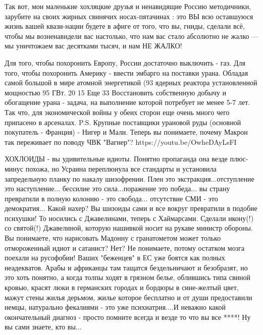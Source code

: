 Так вот, мои маленькие хохляцкие друзья и ненавидящие Россию методичники,
зарубите на своих жирных свинячих носах-пятачинах : это ВЫ всю оставшуюся жизнь
вашей квази-нации будете в афиге от того, что вы, гниды, сделали всё, чтобы мы
возненавидели вас настолько, что нам вас стало абсолютно не жалко — мы
уничтожаем вас десятками тысяч, и нам НЕ ЖАЛКО!

Для того, чтобы похоронить Европу, России достаточно выключить - газ.
Для того, чтобы похоронить Америку - ввести эмбарго на поставки урана.
Обладая самой большой в мире атомной энергетикой (93 ядерных реактора установленной мощностью 95 ГВт. 20%
15%
Еще 33%
Восстановить собственную добычу и обогащение урана - задача, на выполнение которой потребует не менее 5-7 лет.
Так что, для экономической войны у обеих сторон еще очень много чего припасено в арсеналах.
P.S. Крупные поставщики урановой руды (основной покупатель - Франция) - Нигер и Мали.
Теперь вы понимаете, почему Макрон так переживает по поводу ЧВК "Вагнер"?
https://youtu.be/OwheDAyLsFI

ХОХЛОИДЫ - вы удивительные идиоты. Понятно пропаганда она везде плюс-минус
похожа, но Усраина переплюнула все стандарты и установила запредельную планку
по накалу шизофрении. Плен это экстракция...отступление это наступление...
бессилие это сила...поражение это победа... вы страну превратили в полную
колонию - это свобода... отсутствие СМИ - это демократия... Какой нахер? Вы
шизоиды сами и все вокруг превратили в подобие психушки! То носились с
Джавелинами, теперь с Хаймарсами. Сделали икону(!) со святой(!) Джавелиной,
которую нашивкой носит на рукаве министр обороны. Вы понимаете, что нарисовать
Мадонну с гранатометом может только отмороженный идиот и сатанист? Нет? Не
понимаете, потому остатком мозга поехали на русофобии! Ваших "беженцев" в ЕС
уже боятся как полных неадекватов. Арабы и африканцы там тащатся бездельничают
и безобразят, но это хоть понятно, а когда толпы ходят в грязном белье,
облившись типа свиной кровью, красят люки в германских городах и бордюры в
сине-желтый цвет, мажут стены жилья дерьмом, жилье которое бесплатно и от души
предоставили немцы, натурально фекалиями - это уже психиатрия....И неважно
какой окончательный диагноз - просто помните всегда и везде то что вы все ****!
Ну вы сами знаете, кто вы...

